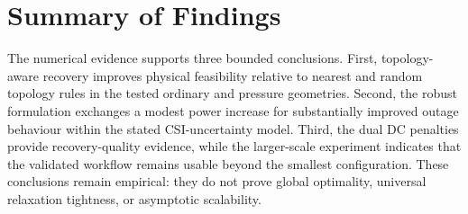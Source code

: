 \section{Summary of Findings}

The numerical evidence supports three bounded conclusions. First,
topology-aware recovery improves physical feasibility relative to nearest and
random topology rules in the tested ordinary and pressure geometries. Second,
the robust formulation exchanges a modest power increase for substantially
improved outage behaviour within the stated CSI-uncertainty model. Third, the
dual DC penalties provide recovery-quality evidence, while the larger-scale
experiment indicates that the validated workflow remains usable beyond the
smallest configuration. These conclusions remain empirical: they do not prove
global optimality, universal relaxation tightness, or asymptotic scalability.
